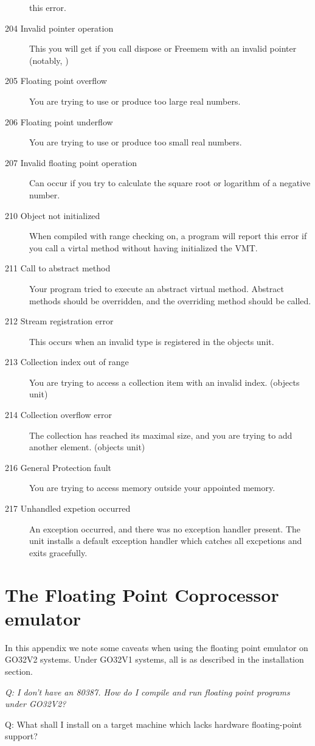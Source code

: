\documentclass{report}
\begin{document}
\begin{description}
this error.
\item [204  Invalid pointer operation]
This you will get if you call dispose or Freemem with an invalid pointer
(notably, )
\item [205  Floating point overflow]
You are trying to use or produce too large real numbers. 
\item [206  Floating point underflow]
You are trying to use or produce too small real numbers. 
\item [207  Invalid floating point operation]
Can occur if you try to calculate the square root or logarithm of a negative
number.
\item [210  Object not initialized]
When compiled with range checking on, a program will report this error if
you call a virtal method without having initialized the VMT.
\item [211  Call to abstract method]
Your program tried to execute an abstract virtual method. Abstract methods
should be overridden, and the overriding method should be called.
\item [212  Stream registration error]
This occurs when an invalid type is registered in the objects unit.
\item [213  Collection index out of range]
You are trying to access a collection item with an invalid index.
(objects unit) 
\item [214  Collection overflow error]
The collection has reached its maximal size, and you are trying to add
another element. (objects unit)
\item [216  General Protection fault]
You are trying to access memory outside your appointed memory.
\item [217 Unhandled expetion occurred]
An exception occurred, and there was no exception handler present.
The  unit installs a default exception handler which catches
all excpetions and exits gracefully.
\end{description}


\chapter{The Floating Point Coprocessor emulator}

In this appendix we note some caveats when using the floating point 
emulator on GO32V2 systems. Under GO32V1 systems, all is as described in
the installation section.

{\em Q: I don't have an 80387. How do I compile and run floating point
   programs under GO32V2?

     Q: What shall I install on a target machine which lacks hardware
   floating-point support?
}
\end{document}
